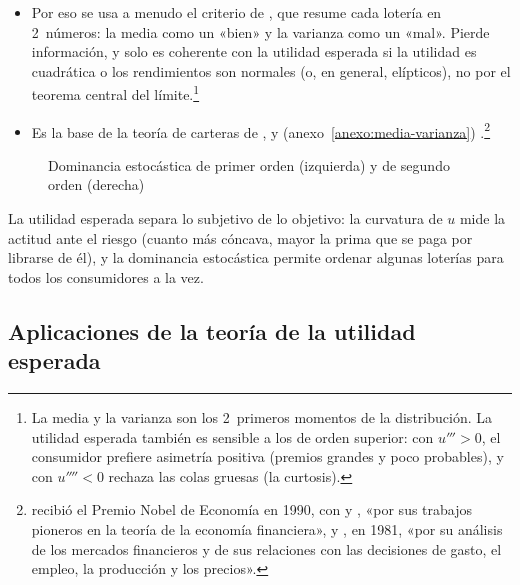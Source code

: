 \documentclass[11pt]{article}
\begin{document}
\begin{itemize}
  \begin{itemize}
  \item Por eso se usa a menudo el criterio de , que resume cada lotería en 2~números: la media como un «bien» y la varianza como un «mal». Pierde información\nocite{BikhchandaniHirshleiferRiley2013Analytics}, y solo es coherente con la utilidad esperada si la utilidad es cuadrática o los rendimientos son normales (o, en general, elípticos), no por el teorema central del límite\nocite{Tobin1958Liquidity,Chamberlain1983Characterization}.\footnote{La media y la varianza son los 2~primeros momentos de la distribución. La utilidad esperada también es sensible a los de orden superior: con $u'''>0$, el consumidor prefiere asimetría positiva (premios grandes y poco probables), y con $u''''<0$ rechaza las colas gruesas (la curtosis).}
  \item Es la base de la teoría de carteras de ,  y  (anexo~\ref{anexo:media-varianza}) .\footnote{ recibió el Premio Nobel de Economía en 1990, con  y , «por sus trabajos pioneros en la teoría de la economía financiera»\nocite{Nobel1990Markowitz}, y , en 1981, «por su análisis de los mercados financieros y de sus relaciones con las decisiones de gasto, el empleo, la producción y los precios»\nocite{Nobel1981Tobin}.}
  \end{itemize}
\end{itemize}

\begin{figure}[H]
\centering
\caption{Dominancia estocástica de primer orden (izquierda) y de segundo orden (derecha)}\label{fig:dominancia}
\end{figure}

\begin{ideaclave}
La utilidad esperada separa lo subjetivo de lo objetivo: la curvatura de $u$ mide la actitud ante el riesgo (cuanto más cóncava, mayor la prima que se paga por librarse de él), y la dominancia estocástica permite ordenar algunas loterías para todos los consumidores a la vez.
\end{ideaclave}

\subsection{Aplicaciones de la teoría de la utilidad esperada}\label{sec:aplicaciones}
\end{document}
